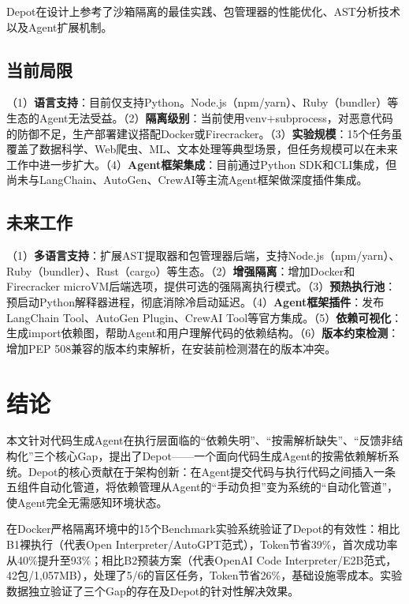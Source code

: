 \documentclass[10pt]{ctexart}
\begin{document}
Depot在设计上参考了沙箱隔离的最佳实践\cite{merkel2014docker}、包管理器的性能优化\cite{uv2024}、AST分析技术\cite{pythonast2024}以及Agent扩展机制\cite{anthropic2025mcp,anthropic2025skillsystem}。

\subsection{当前局限}
（1）\textbf{语言支持}：目前仅支持Python。Node.js（npm/yarn）、Ruby（bundler）等生态的Agent无法受益。（2）\textbf{隔离级别}：当前使用venv+subprocess，对恶意代码的防御不足\cite{agache2020firecracker}，生产部署建议搭配Docker或Firecracker。（3）\textbf{实验规模}：15个任务虽覆盖了数据科学、Web爬虫、ML、文本处理等典型场景，但任务规模可以在未来工作中进一步扩大。（4）\textbf{Agent框架集成}：目前通过Python SDK和CLI集成，但尚未与LangChain、AutoGen、CrewAI等主流Agent框架做深度插件集成\cite{liu2024agentless,guo2024aider}。

\subsection{未来工作}
（1）\textbf{多语言支持}：扩展AST提取器和包管理器后端，支持Node.js（npm/yarn）、Ruby（bundler）、Rust（cargo）等生态。（2）\textbf{增强隔离}：增加Docker和Firecracker microVM后端选项\cite{agache2020firecracker,merkel2014docker}，提供可选的强隔离执行模式。（3）\textbf{预热执行池}：预启动Python解释器进程，彻底消除冷启动延迟。（4）\textbf{Agent框架插件}：发布LangChain Tool、AutoGen Plugin、CrewAI Tool等官方集成\cite{qiao2024taskweaver}。（5）\textbf{依赖可视化}：生成import依赖图，帮助Agent和用户理解代码的依赖结构。（6）\textbf{版本约束检测}：增加PEP 508\cite{pep508}兼容的版本约束解析，在安装前检测潜在的版本冲突。

\section{结论}

本文针对代码生成Agent在执行层面临的“依赖失明”、“按需解析缺失”、“反馈非结构化”三个核心Gap，提出了Depot——一个面向代码生成Agent的按需依赖解析系统。Depot的核心贡献在于架构创新：在Agent提交代码与执行代码之间插入一条五组件自动化管道，将依赖管理从Agent的“手动负担”变为系统的“自动化管道”，使Agent完全无需感知环境状态。

在Docker严格隔离环境中的15个Benchmark实验系统验证了Depot的有效性：相比B1裸执行（代表Open Interpreter/AutoGPT范式），Token节省39\%，首次成功率从40\%提升至93\%；相比B2预装方案（代表OpenAI Code Interpreter/E2B范式，42包/1,057MB），处理了5/6的盲区任务，Token节省26\%，基础设施零成本。实验数据独立验证了三个Gap的存在及Depot的针对性解决效果。
\end{document}
